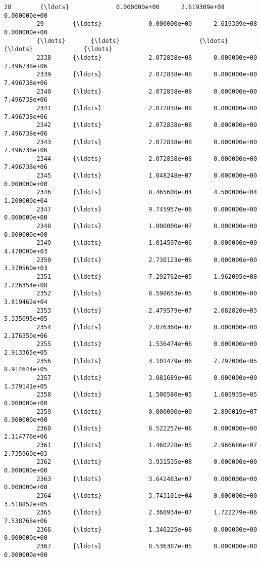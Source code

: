 \documentclass[11pt]{article}
\begin{document}
\begin{Verbatim}[commandchars=\\\{\}]
         28        {\ldots}             0.000000e+00      2.619309e+08     0.000000e+00   
         29        {\ldots}             0.000000e+00      2.619309e+08     0.000000e+00   
         {\ldots}       {\ldots}                      {\ldots}               {\ldots}              {\ldots}   
         2338      {\ldots}             2.072838e+08      0.000000e+00     7.496738e+06   
         2339      {\ldots}             2.072838e+08      0.000000e+00     7.496738e+06   
         2340      {\ldots}             2.072838e+08      0.000000e+00     7.496738e+06   
         2341      {\ldots}             2.072838e+08      0.000000e+00     7.496738e+06   
         2342      {\ldots}             2.072838e+08      0.000000e+00     7.496738e+06   
         2343      {\ldots}             2.072838e+08      0.000000e+00     7.496738e+06   
         2344      {\ldots}             2.072838e+08      0.000000e+00     7.496738e+06   
         2345      {\ldots}             1.048248e+07      0.000000e+00     0.000000e+00   
         2346      {\ldots}             8.465600e+04      4.500000e+04     1.200000e+04   
         2347      {\ldots}             9.745957e+06      0.000000e+00     0.000000e+00   
         2348      {\ldots}             1.000000e+07      0.000000e+00     0.000000e+00   
         2349      {\ldots}             1.014597e+06      0.000000e+00     4.470000e+03   
         2350      {\ldots}             2.730123e+06      0.000000e+00     3.370560e+03   
         2351      {\ldots}             7.292762e+05      1.962095e+08     2.226354e+08   
         2352      {\ldots}             8.598653e+05      0.000000e+00     3.819462e+04   
         2353      {\ldots}             2.479579e+07      2.082820e+03     5.335095e+05   
         2354      {\ldots}             2.076360e+07      0.000000e+00     2.176350e+06   
         2355      {\ldots}             1.536474e+06      0.000000e+00     2.913365e+05   
         2356      {\ldots}             3.101479e+06      7.797000e+05     8.914644e+05   
         2357      {\ldots}             3.081689e+06      0.000000e+00     1.379141e+05   
         2358      {\ldots}             1.500580e+05      1.605935e+05     0.000000e+00   
         2359      {\ldots}             0.000000e+00      2.890019e+07     0.000000e+00   
         2360      {\ldots}             8.522257e+06      0.000000e+00     2.114776e+06   
         2361      {\ldots}             1.460228e+05      2.966686e+07     2.735960e+03   
         2362      {\ldots}             3.931535e+08      0.000000e+00     0.000000e+00   
         2363      {\ldots}             3.642483e+07      0.000000e+00     0.000000e+00   
         2364      {\ldots}             3.743101e+04      0.000000e+00     3.518852e+05   
         2365      {\ldots}             2.360934e+07      1.722279e+06     7.538768e+06   
         2366      {\ldots}             1.346225e+08      0.000000e+00     0.000000e+00   
         2367      {\ldots}             8.536387e+05      0.000000e+00     0.000000e+00   
         

\end{Verbatim}
\end{document}

